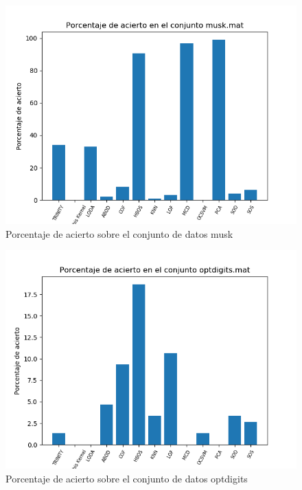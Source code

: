 \begin{figure}[H]
	\centering
	\includegraphics[scale=0.7]{imagenes/imgs-exp1/accuracy/musk}
	\caption{Porcentaje de acierto sobre el conjunto de datos musk}
	\label{musk_accuracy}
\end{figure}

\begin{figure}[H]
	\centering
	\includegraphics[scale=0.7]{imagenes/imgs-exp1/accuracy/optdigits}
	\caption{Porcentaje de acierto sobre el conjunto de datos optdigits}
	\label{optdigits_accuracy}
\end{figure}

